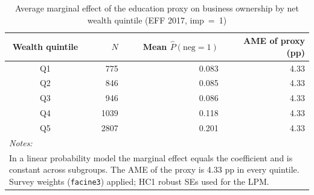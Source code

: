 \begin{table}

\caption{\label{tab:tab:ame_quintile}Average marginal effect of the education proxy on business ownership by net wealth quintile (EFF 2017, imp~=~1)}
\centering
\begin{tabular}[t]{crrr}
\toprule
Wealth quintile & $N$ & Mean $\hat{P}(\text{neg}=1)$ & AME of proxy (pp)\\
\midrule
Q1 & 775 & 0.083 & 4.33\\
Q2 & 846 & 0.085 & 4.33\\
Q3 & 946 & 0.086 & 4.33\\
Q4 & 1039 & 0.118 & 4.33\\
Q5 & 2807 & 0.201 & 4.33\\
\bottomrule
\multicolumn{4}{l}{\rule{0pt}{1em}\textit{\textit{Notes:} }}\\
\multicolumn{4}{l}{\rule{0pt}{1em}In a linear probability model the marginal effect equals the coefficient and is constant across subgroups. The AME of the proxy is \num{4.33} pp in every quintile. Survey weights (\texttt{facine3}) applied; HC1 robust SEs used for the LPM.}\\
\end{tabular}
\end{table}
